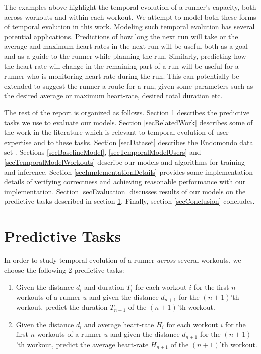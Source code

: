 \documentclass{acm_proc_article-sp}
\begin{document}
The examples above highlight the temporal evolution of a runner's capacity, both across workouts and within each workout. We attempt to model both these forms of temporal evolution in this work. Modeling such temporal evolution has several potential applications. Predictions of how long the next run will take or the average and maximum heart-rates in the next run will be useful both as a goal and as a guide to the runner while planning the run. Similarly, predicting how the heart-rate will change in the remaining part of a run will be useful for a runner who is monitoring heart-rate during the run. This can potentially be extended to suggest the runner a route for a run, given some parameters such as the desired average or maximum heart-rate, desired total duration etc.

The rest of the report is organized as follows. Section \ref{secPredictiveTasks} describes the predictive tasks we use to evaluate our models. Section \ref{secRelatedWork} describes some of the work in the literature which is relevant to temporal evolution of user expertise and to these tasks. Section \ref{secDataset} describes the Endomondo data set \cite{endomondo}. Sections \ref{secBaselineModel}, \ref{secTemporalModelUsers} and \ref{secTemporalModelWorkouts} describe our models and algorithms for training and inference. Section \ref{secImplementationDetails} provides some implementation details of verifying correctness and achieving reasonable performance with our implementation. Section \ref{secEvaluation} discusses results of our models on the predictive tasks described in section \ref{secPredictiveTasks}. Finally, section \ref{secConclusion} concludes.

\section{Predictive Tasks}
\label{secPredictiveTasks}
In order to study temporal evolution of a runner \emph{across} several workouts, we choose the following 2 predictive tasks:
\begin{enumerate}
\item Given the distance $d_i$ and duration $T_i$ for each workout $i$ for the first $n$ workouts of a runner $u$ and given the distance $d_{n+1}$ for the $(n+1)$'th workout, predict the duration $T_{n+1}$ of the $(n+1)$'th workout.
\item Given the distance $d_i$ and average heart-rate $H_i$ for each workout $i$ for the first $n$ workouts of a runner $u$ and given the distance $d_{n+1}$ for the $(n+1)$'th workout, predict the average heart-rate $H_{n+1}$ of the $(n+1)$'th workout.
\end{enumerate}
\end{document}
